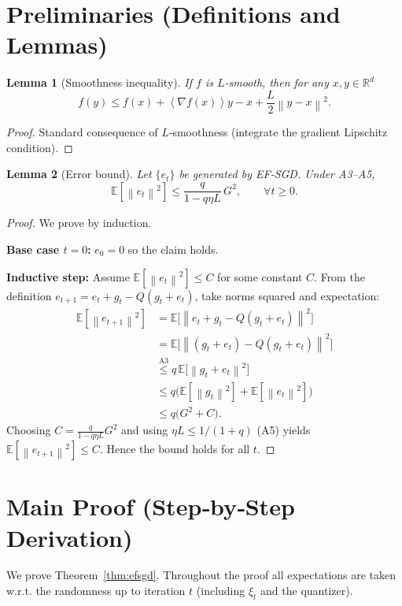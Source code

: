 \documentclass{article}
\newtheorem{lemma}{Lemma}
\newcommand{\E}{\mathbb{E}}
\newcommand{\R}{\mathbb{R}}
\newcommand{\norm}[1]{\left\|#1\right\|}
\newcommand{\inner}[1]{\left\langle #1 \right\rangle}
\begin{document}
\newpage
\section*{Preliminaries (Definitions and Lemmas)}
\begin{lemma}[Smoothness inequality]
\label{lem:smooth}
If $f$ is $L$‑smooth, then for any $x,y\in\R^{d}$
\[
f(y)\le f(x)+\inner{\nabla f(x)}{y-x}+\frac{L}{2}\norm{y-x}^{2}.
\]
\end{lemma}
\begin{proof}
Standard consequence of $L$‑smoothness (integrate the gradient Lipschitz condition). \qedhere
\end{proof}

\begin{lemma}[Error bound]
\label{lem:error-bound}
Let $\{e_{t}\}$ be generated by EF‑SGD. Under A3–A5,
\[
\E[\norm{e_{t}}^{2}] \le \frac{q}{1-q\eta L}\, G^{2},\qquad\forall t\ge0.
\]
\end{lemma}
\begin{proof}
We prove by induction.  

\textbf{Base case $t=0$:} $e_{0}=0$ so the claim holds.  

\textbf{Inductive step:} Assume $\E[\norm{e_{t}}^{2}]\le C$ for some constant $C$.  
From the definition $e_{t+1}=e_{t}+g_{t}-Q(g_{t}+e_{t})$, take norms squared and expectation:
\[
\begin{aligned}
\E[\norm{e_{t+1}}^{2}]
&=\E\!\bigl[\norm{e_{t}+g_{t}-Q(g_{t}+e_{t})}^{2}\bigr] \\
&=\E\!\bigl[\norm{(g_{t}+e_{t})-Q(g_{t}+e_{t})}^{2}\bigr] \\
&\overset{\text{A3}}{\le} q\,\E\!\bigl[\norm{g_{t}+e_{t}}^{2}\bigr] \\
&\le q\bigl(\E[\norm{g_{t}}^{2}]+\E[\norm{e_{t}}^{2}]\bigr) \\
&\le q\bigl(G^{2}+C\bigr).
\end{aligned}
\]
Choosing $C=\frac{q}{1-q\eta L}G^{2}$ and using $\eta L\le 1/(1+q)$ (A5) yields $\E[\norm{e_{t+1}}^{2}]\le C$. Hence the bound holds for all $t$. \qedhere
\end{proof}

\newpage
\section*{Main Proof (Step‑by‑Step Derivation)}
We prove Theorem~\ref{thm:efsgd}. Throughout the proof all expectations are taken w.r.t. the randomness up to iteration $t$ (including $\xi_{t}$ and the quantizer).
\end{document}
